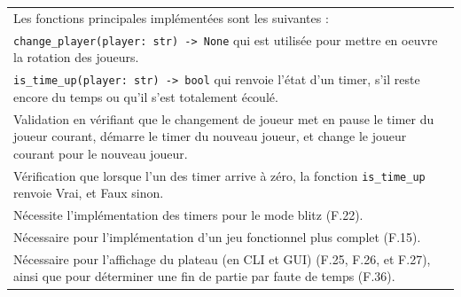 \documentclass[a4paper,12pt]{article}
\begin{document}
\begin{tabularx}{\textwidth}{|X|}
    Les fonctions principales implémentées sont les suivantes :                                                                                                        \\
    \texttt{change\_player(player: str) -> None} qui est utilisée pour mettre en
    oeuvre la rotation des joueurs.                                                                                                                                    \\ \texttt{is\_time\_up(player: str) -> bool}
    qui renvoie l’état d’un timer, s’il reste encore du temps ou qu’il s’est
    totalement écoulé.                                                                                                                                                 \\ \arrayrulecolor{MediumAquamarine}\hline
    \arrayrulecolor{CornflowerBlue} Validation en vérifiant que le changement de
    joueur met en pause le timer du joueur courant, démarre le timer du nouveau
    joueur, et change le joueur courant pour le nouveau joueur.                                                                                                        \\ Vérification que
    lorsque l’un des timer arrive à zéro, la fonction \texttt{is\_time\_up} renvoie
    Vrai, et Faux sinon.                                                                                                                                               \\ \arrayrulecolor{MediumAquamarine}\hline
    \arrayrulecolor{CornflowerBlue} Nécessite l’implémentation des timers pour le
    mode blitz (F.22).                                                                                                                                                 \\ Nécessaire pour l’implémentation d’un jeu fonctionnel
    plus complet (F.15).                                                                                                                                               \\ Nécessaire pour l’affichage du plateau (en CLI et GUI)
    (F.25, F.26, et F.27), ainsi que pour déterminer une fin de partie par faute de
    temps (F.36).                                                                                                                                                      \\ \hline
\end{tabularx}
\end{document}
